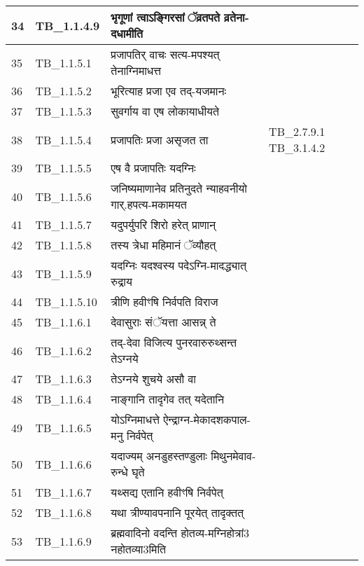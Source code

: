 \documentclass[17pt]{extarticle}
\begin{document}
\begin{longtable}{||p{0.4in}||p{0.9in}||p{4.0in}||p{0.9in}||}
        \hline
            34 & TB\_1.1.4.9 & भृगूणां त्वाऽङ्गिरसां ॅव्रतपते व्रतेना{-}दधामीति &      \\
        \hline
            35 & TB\_1.1.5.1 & प्रजापतिर् वाचः सत्य{-}मपश्यत् तेनाग्निमाधत्त &      \\
        \hline
            36 & TB\_1.1.5.2 & भूरित्याह प्रजा एव तद्{-}यजमानः &      \\
        \hline
            37 & TB\_1.1.5.3 & सुवर्गाय वा एष लोकायाधीयते &      \\
        \hline
            38 & TB\_1.1.5.4 & प्रजापतिः प्रजा असृजत ता &  TB\_2.7.9.1 TB\_3.1.4.2       \\
        \hline
            39 & TB\_1.1.5.5 & एष वै प्रजापतिः यदग्निः &      \\
        \hline
            40 & TB\_1.1.5.6 & जनिष्यमाणानेव प्रतिनुदते न्याहवनीयो गार्.हपत्य{-}मकामयत &      \\
        \hline
            41 & TB\_1.1.5.7 & यदुपर्युपरि शिरो हरेत् प्राणान् &      \\
        \hline
            42 & TB\_1.1.5.8 & तस्य त्रेधा महिमानं ॅव्यौहत् &      \\
        \hline
            43 & TB\_1.1.5.9 & यदग्निः यदश्वस्य पदेऽग्नि{-}मादद्ध्यात् रुद्राय &      \\
        \hline
            44 & TB\_1.1.5.10 & त्रीणि हवीꣳषि निर्वपति विराज &      \\
        \hline
            45 & TB\_1.1.6.1 & देवासुराः संॅयत्ता आसन्न् ते &      \\
        \hline
            46 & TB\_1.1.6.2 & तद्{-}देवा विजित्य पुनरवारुरुथ्सन्त तेऽग्नये &      \\
        \hline
            47 & TB\_1.1.6.3 & तेऽग्नये शुचये असौ वा &      \\
        \hline
            48 & TB\_1.1.6.4 & नाङ्गानि तादृगेव तत् यदेतानि &      \\
        \hline
            49 & TB\_1.1.6.5 & योऽग्निमाधत्ते ऐन्द्राग्न{-}मेकादशकपाल{-} मनु निर्वपेत् &      \\
        \hline
            50 & TB\_1.1.6.6 & यदाज्यम् अनडुहस्तण्डुलाः मिथुनमेवाव{-}रुन्धे घृते &      \\
        \hline
            51 & TB\_1.1.6.7 & यथ्सद्य एतानि हवीꣳषि निर्वपेत् &      \\
        \hline
            52 & TB\_1.1.6.8 & यथा त्रीण्यावपनानि पूरयेत् तादृक्तत् &      \\
        \hline
            53 & TB\_1.1.6.9 & ब्रह्मवादिनो वदन्ति होतव्य{-}मग्निहोत्रां3 नहोतव्या3मिति &      \\

\end{longtable}
\end{document}
